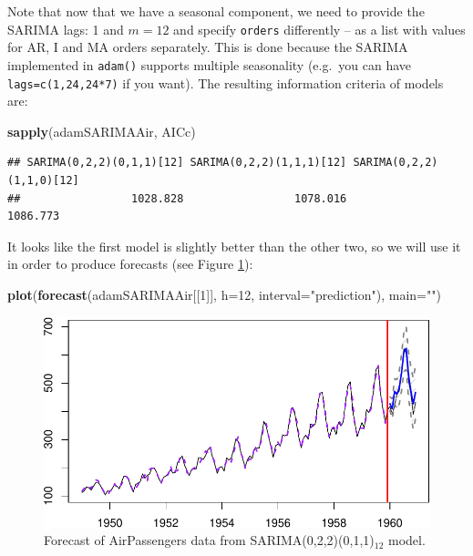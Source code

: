 \documentclass[]{book}
\newenvironment{Shaded}{\begin{snugshade}}{\end{snugshade}}
\newcommand{\DataTypeTok}[1]{\textcolor[rgb]{0.13,0.29,0.53}{#1}}
\newcommand{\DecValTok}[1]{\textcolor[rgb]{0.00,0.00,0.81}{#1}}
\newcommand{\KeywordTok}[1]{\textcolor[rgb]{0.13,0.29,0.53}{\textbf{#1}}}
\newcommand{\NormalTok}[1]{#1}
\newcommand{\StringTok}[1]{\textcolor[rgb]{0.31,0.60,0.02}{#1}}
\theoremstyle{definition}
\theoremstyle{definition}
\theoremstyle{definition}
\theoremstyle{definition}
\theoremstyle{remark}
\begin{document}
Note that now that we have a seasonal component, we need to provide the SARIMA lags: 1 and \(m=12\) and specify \texttt{orders} differently -- as a list with values for AR, I and MA orders separately. This is done because the SARIMA implemented in \texttt{adam()} supports multiple seasonality (e.g.~you can have \texttt{lags=c(1,24,24*7)} if you want). The resulting information criteria of models are:

\begin{Shaded}
\begin{Highlighting}[]
\KeywordTok{sapply}\NormalTok{(adamSARIMAAir, AICc)}
\end{Highlighting}
\end{Shaded}

\begin{verbatim}
## SARIMA(0,2,2)(0,1,1)[12] SARIMA(0,2,2)(1,1,1)[12] SARIMA(0,2,2)(1,1,0)[12] 
##                 1028.828                 1078.016                 1086.773
\end{verbatim}

It looks like the first model is slightly better than the other two, so we will use it in order to produce forecasts (see Figure \ref{fig:adamSARIMAPlotAir}):

\begin{Shaded}
\begin{Highlighting}[]
\KeywordTok{plot}\NormalTok{(}\KeywordTok{forecast}\NormalTok{(adamSARIMAAir[[}\DecValTok{1}\NormalTok{]], }\DataTypeTok{h=}\DecValTok{12}\NormalTok{,}
              \DataTypeTok{interval=}\StringTok{"prediction"}\NormalTok{),}
     \DataTypeTok{main=}\StringTok{""}\NormalTok{)}
\end{Highlighting}
\end{Shaded}

\begin{figure}
\centering
\includegraphics{Svetunkov--2022----ADAM_files/figure-latex/adamSARIMAPlotAir-1.pdf}
\caption{\label{fig:adamSARIMAPlotAir}Forecast of AirPassengers data from SARIMA(0,2,2)(0,1,1)\(_{12}\) model.}
\end{figure}
\end{document}
